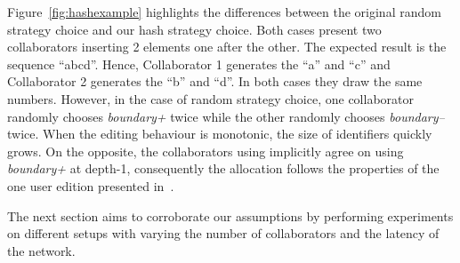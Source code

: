 Figure~\ref{fig:hashexample} highlights the differences between the original
random strategy choice and our hash strategy choice. Both cases present two
collaborators inserting 2 elements one after the other. The expected result is
the sequence ``abcd''. Hence, Collaborator 1 generates the ``a'' and ``c'' and
Collaborator 2 generates the ``b'' and ``d''. In both cases they draw the
same numbers. However, in the case of random strategy choice, one collaborator
randomly chooses \emph{boundary+} twice while the other randomly chooses
\emph{boundary--} twice. When the editing behaviour is monotonic, the size of
identifiers quickly grows. On the opposite, the collaborators using \NAME{}
implicitly agree on using \emph{boundary+} at depth-1, consequently the
allocation follows the properties of the one user edition presented
in~\cite{nedelec2013lseq}.

The next section aims to corroborate our assumptions by performing experiments
on different setups with varying the number of collaborators and the latency of
the network.

